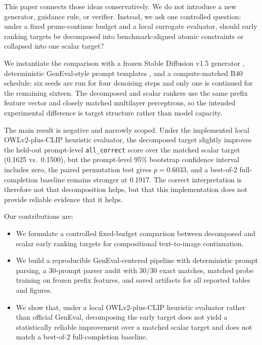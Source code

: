 \documentclass{article}
\newcommand{\budget}{B40}
\begin{document}
This paper connects those ideas conservatively. We do not introduce a new generator, guidance rule, or verifier. Instead, we ask one controlled question: under a fixed prune-continue budget and a local surrogate evaluator, should early ranking targets be decomposed into benchmark-aligned atomic constraints or collapsed into one scalar target?

We instantiate the comparison with a frozen Stable Diffusion v1.5 generator \citep{rombach2022highresolutionimagesynthesislatent}, deterministic GenEval-style prompt templates \citep{ghosh2023genevalobjectfocusedframeworkevaluating}, and a compute-matched \budget{} schedule: six seeds are run for four denoising steps and only one is continued for the remaining sixteen. The decomposed and scalar rankers use the same prefix feature vector and closely matched multilayer perceptrons, so the intended experimental difference is target structure rather than model capacity.

The main result is negative and narrowly scoped. Under the implemented local OWLv2-plus-CLIP heuristic evaluator, the decomposed target slightly improves the held-out prompt-level \texttt{all\_correct} score over the matched scalar target (0.1625 vs.\ 0.1500), but the prompt-level 95\% bootstrap confidence interval includes zero, the paired permutation test gives $p=0.6033$, and a best-of-2 full-completion baseline remains stronger at 0.1917. The correct interpretation is therefore not that decomposition helps, but that this implementation does not provide reliable evidence that it helps.

Our contributions are:
\begin{itemize}
  \item We formulate a controlled fixed-budget comparison between decomposed and scalar early ranking targets for compositional text-to-image continuation.
  \item We build a reproducible GenEval-centered pipeline with deterministic prompt parsing, a 30-prompt parser audit with 30/30 exact matches, matched probe training on frozen prefix features, and saved artifacts for all reported tables and figures.
  \item We show that, under a local OWLv2-plus-CLIP heuristic evaluator rather than official GenEval, decomposing the early target does not yield a statistically reliable improvement over a matched scalar target and does not match a best-of-2 full-completion baseline.
\end{itemize}
\end{document}
